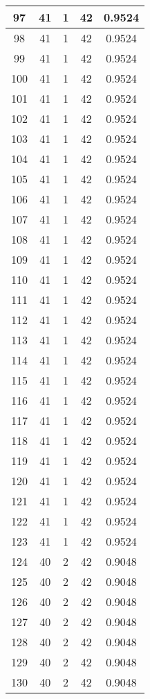 \documentclass[letterpaper, 12pt]{article}
\begin{document}
\begin{longtable}{|c|c|c|c|c|}
\hline
97 & 41 & 1 & 42 & 0.9524 \\
\hline
98 & 41 & 1 & 42 & 0.9524 \\
\hline
99 & 41 & 1 & 42 & 0.9524 \\
\hline
100 & 41 & 1 & 42 & 0.9524 \\
\hline
101 & 41 & 1 & 42 & 0.9524 \\
\hline
102 & 41 & 1 & 42 & 0.9524 \\
\hline
103 & 41 & 1 & 42 & 0.9524 \\
\hline
104 & 41 & 1 & 42 & 0.9524 \\
\hline
105 & 41 & 1 & 42 & 0.9524 \\
\hline
106 & 41 & 1 & 42 & 0.9524 \\
\hline
107 & 41 & 1 & 42 & 0.9524 \\
\hline
108 & 41 & 1 & 42 & 0.9524 \\
\hline
109 & 41 & 1 & 42 & 0.9524 \\
\hline
110 & 41 & 1 & 42 & 0.9524 \\
\hline
111 & 41 & 1 & 42 & 0.9524 \\
\hline
112 & 41 & 1 & 42 & 0.9524 \\
\hline
113 & 41 & 1 & 42 & 0.9524 \\
\hline
114 & 41 & 1 & 42 & 0.9524 \\
\hline
115 & 41 & 1 & 42 & 0.9524 \\
\hline
116 & 41 & 1 & 42 & 0.9524 \\
\hline
117 & 41 & 1 & 42 & 0.9524 \\
\hline
118 & 41 & 1 & 42 & 0.9524 \\
\hline
119 & 41 & 1 & 42 & 0.9524 \\
\hline
120 & 41 & 1 & 42 & 0.9524 \\
\hline
121 & 41 & 1 & 42 & 0.9524 \\
\hline
122 & 41 & 1 & 42 & 0.9524 \\
\hline
123 & 41 & 1 & 42 & 0.9524 \\
\hline
124 & 40 & 2 & 42 & 0.9048 \\
\hline
125 & 40 & 2 & 42 & 0.9048 \\
\hline
126 & 40 & 2 & 42 & 0.9048 \\
\hline
127 & 40 & 2 & 42 & 0.9048 \\
\hline
128 & 40 & 2 & 42 & 0.9048 \\
\hline
129 & 40 & 2 & 42 & 0.9048 \\
\hline
130 & 40 & 2 & 42 & 0.9048 \\

\end{longtable}
\end{document}
